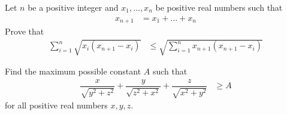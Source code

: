 \documentclass{subfile}
\begin{document}
		\begin{problem}
			Let $n$ be a positive integer and $x_{1},\ldots,x_{n}$ be positive real numbers such that
				\begin{align*}
					x_{n+1}
						& = x_{1}+\ldots+x_{n}
				\end{align*}
			Prove that
				\begin{align*}
					\sum_{i=1}^{n}\sqrt{x_{i}(x_{n+1}-x_{i})}
						& \leq \sqrt{\sum_{i=1}^{n}x_{n+1}(x_{n+1}-x_{i})}
				\end{align*}
		\end{problem}
	
		\begin{problem}
			Find the maximum possible constant $A$ such that
				\begin{align*}
					\dfrac{x}{\sqrt{y^{2}+z^{2}}}+\dfrac{y}{\sqrt{z^{2}+x^{2}}}+\dfrac{z}{\sqrt{x^{2}+y^{2}}}
						& \geq A
				\end{align*}
			for all positive real numbers $x,y,z$.
		\end{problem}
\end{document}
